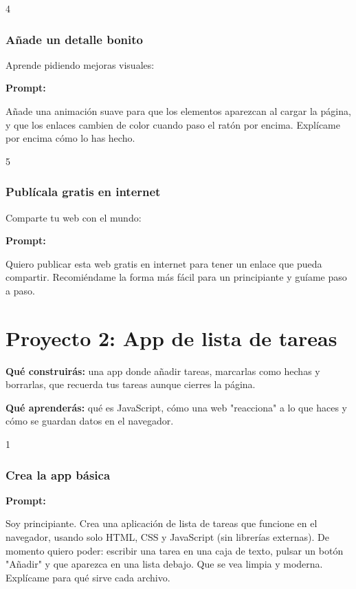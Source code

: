 \documentclass[11pt,a4paper]{report}
\begin{document}
4\subsubsection{Añade un detalle bonito}

Aprende pidiendo mejoras visuales:

\noindent\textbf{Prompt: }
\begin{codebox}
Añade una animación suave para que los elementos aparezcan al cargar la página, y que los enlaces cambien de color cuando paso el ratón por encima. Explícame por encima cómo lo has hecho.
\end{codebox}

5\subsubsection{Publícala gratis en internet}

Comparte tu web con el mundo:

\noindent\textbf{Prompt: }
\begin{codebox}
Quiero publicar esta web gratis en internet para tener un enlace que pueda compartir. Recomiéndame la forma más fácil para un principiante y guíame paso a paso.
\end{codebox}

\section{ Proyecto 2: App de lista de tareas}

\textbf{Qué construirás:} una app donde añadir tareas, marcarlas como hechas y borrarlas, que recuerda tus tareas aunque cierres la página.

\textbf{Qué aprenderás:} qué es JavaScript, cómo una web "reacciona" a lo que haces y cómo se guardan datos en el navegador.

1\subsubsection{Crea la app básica}

\noindent\textbf{Prompt: }
\begin{codebox}
Soy principiante. Crea una aplicación de lista de tareas que funcione en el navegador, usando solo HTML, CSS y JavaScript (sin librerías externas). De momento quiero poder: escribir una tarea en una caja de texto, pulsar un botón "Añadir" y que aparezca en una lista debajo. Que se vea limpia y moderna. Explícame para qué sirve cada archivo.
\end{codebox}
\end{document}
